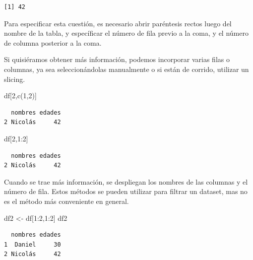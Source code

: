\documentclass[
  letterpaper,
  DIV=11,
  numbers=noendperiod]{scrreprt}
\newenvironment{Shaded}{\begin{snugshade}}{\end{snugshade}}
\newcommand{\DecValTok}[1]{\textcolor[rgb]{0.68,0.00,0.00}{#1}}
\newcommand{\FunctionTok}[1]{\textcolor[rgb]{0.28,0.35,0.67}{#1}}
\newcommand{\NormalTok}[1]{\textcolor[rgb]{0.00,0.23,0.31}{#1}}
\newcommand{\OtherTok}[1]{\textcolor[rgb]{0.00,0.23,0.31}{#1}}
\newcommand{\SpecialCharTok}[1]{\textcolor[rgb]{0.37,0.37,0.37}{#1}}
\begin{document}
\begin{verbatim}
[1] 42
\end{verbatim}

Para especificar esta cuestión, es necesario abrir paréntesis rectos
luego del nombre de la tabla, y específicar el número de fila previo a
la coma, y el número de columna posterior a la coma.

Si quisiéramos obtener más información, podemos incorporar varias filas
o columnas, ya sea seleccionándolas manualmente o si están de corrido,
utilizar un slicing.

\begin{Shaded}
\begin{Highlighting}[]
\NormalTok{df[}\DecValTok{2}\NormalTok{,}\FunctionTok{c}\NormalTok{(}\DecValTok{1}\NormalTok{,}\DecValTok{2}\NormalTok{)]}
\end{Highlighting}
\end{Shaded}

\begin{verbatim}
  nombres edades
2 Nicolás     42
\end{verbatim}

\begin{Shaded}
\begin{Highlighting}[]
\NormalTok{df[}\DecValTok{2}\NormalTok{,}\DecValTok{1}\SpecialCharTok{:}\DecValTok{2}\NormalTok{]}
\end{Highlighting}
\end{Shaded}

\begin{verbatim}
  nombres edades
2 Nicolás     42
\end{verbatim}

Cuando se trae más información, se despliegan los nombres de las
columnas y el número de fila. Estos métodos se pueden utilizar para
filtrar un dataset, mas no es el método más conveniente en general.

\begin{Shaded}
\begin{Highlighting}[]
\NormalTok{df2 }\OtherTok{\textless{}{-}}\NormalTok{ df[}\DecValTok{1}\SpecialCharTok{:}\DecValTok{2}\NormalTok{,}\DecValTok{1}\SpecialCharTok{:}\DecValTok{2}\NormalTok{]}
\NormalTok{df2}
\end{Highlighting}
\end{Shaded}

\begin{verbatim}
  nombres edades
1  Daniel     30
2 Nicolás     42
\end{verbatim}
\end{document}
